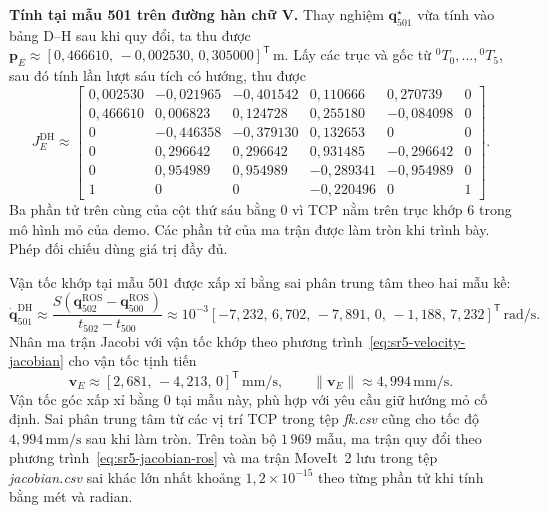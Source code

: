 \noindent\textbf{Tính tại mẫu 501 trên đường hàn chữ V.}
Thay nghiệm \(\mathbf q_{501}^{\star}\) vừa tính vào bảng D--H sau khi quy đổi, ta thu được \(\mathbf p_E\approx[0{,}466610,\,-0{,}002530,\,0{,}305000]^{\mathsf T}\,\mathrm{m}\). Lấy các trục và gốc từ \({}^0T_0,\ldots,{}^0T_5\), sau đó tính lần lượt sáu tích có hướng, thu được
\[
  J_E^{\mathrm{DH}}\approx
  \begin{bmatrix}
     0{,}002530 &-0{,}021965 &-0{,}401542 & 0{,}110666 & 0{,}270739 & 0\\
     0{,}466610 & 0{,}006823 & 0{,}124728 & 0{,}255180 &-0{,}084098 & 0\\
     0          &-0{,}446358 &-0{,}379130 & 0{,}132653 & 0          & 0\\
     0          & 0{,}296642 & 0{,}296642 & 0{,}931485 &-0{,}296642 & 0\\
     0          & 0{,}954989 & 0{,}954989 &-0{,}289341 &-0{,}954989 & 0\\
     1          & 0          & 0          &-0{,}220496 & 0          & 1
  \end{bmatrix}.
\]
Ba phần tử trên cùng của cột thứ sáu bằng \(0\) vì TCP nằm trên trục khớp 6 trong mô hình mỏ của demo. Các phần tử của ma trận được làm tròn khi trình bày. Phép đối chiếu dùng giá trị đầy đủ.

Vận tốc khớp tại mẫu \(501\) được xấp xỉ bằng sai phân trung tâm theo hai mẫu kề:
\[
  \dot{\mathbf q}^{\mathrm{DH}}_{501}
  \approx \frac{S(\mathbf q^{\mathrm{ROS}}_{502}-\mathbf q^{\mathrm{ROS}}_{500})}
                {t_{502}-t_{500}}
  \approx 10^{-3}[-7{,}232,\,6{,}702,\,-7{,}891,\,0,\,-1{,}188,\,7{,}232]^{\mathsf T}
  \,\mathrm{rad/s}.
\]
Nhân ma trận Jacobi với vận tốc khớp theo phương trình~\eqref{eq:sr5-velocity-jacobian} cho vận tốc tịnh tiến
\[
  \mathbf v_E\approx[2{,}681,\,-4{,}213,\,0]^{\mathsf T}\,\mathrm{mm/s},
  \qquad
  \|\mathbf v_E\|\approx4{,}994\,\mathrm{mm/s}.
\]
Vận tốc góc xấp xỉ bằng \(0\) tại mẫu này, phù hợp với yêu cầu giữ hướng mỏ cố định. Sai phân trung tâm từ các vị trí TCP trong tệp \textit{fk.csv} cũng cho tốc độ \(4{,}994\,\mathrm{mm/s}\) sau khi làm tròn. Trên toàn bộ \(1\,969\) mẫu, ma trận quy đổi theo phương trình~\eqref{eq:sr5-jacobian-ros} và ma trận MoveIt~2 lưu trong tệp \textit{jacobian.csv} sai khác lớn nhất khoảng \(1{,}2\times10^{-15}\) theo từng phần tử khi tính bằng mét và radian.

